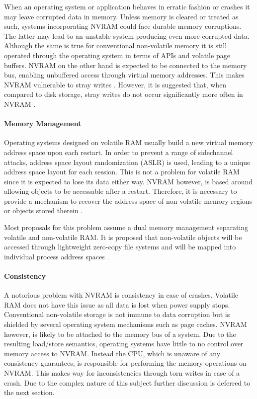When an operating system or application behaves in erratic fashion or crashes it
may leave corrupted data in memory. Unless memory is cleared or treated as such,
systems incorporating NVRAM could face durable memory corruptions. The latter
may lead to an unstable system producing even more corrupted data. Although the
same is true for conventional non-volatile memory it is still operated through
the operating system in terms of APIs and volatile page buffers. NVRAM on the
other hand is expected to be connected to the memory bus, enabling unbuffered
access through virtual memory addresses. This makes NVRAM vulnerable to stray
writes \cite{condit2009better, oukid2017data}. However, it is suggested that,
when compared to disk storage, stray writes do not occur significantly more
often in NVRAM \cite{chen1996rio}.

\paragraph{Memory Management}

Operating systems designed on volatile RAM usually build a new virtual memory
address space upon each restart. In order to prevent a range of sidechannel
attacks, address space layout randomization (ASLR) is used, leading to a unique
address space layout for each session. This is not a problem for volatile RAM
since it is expected to lose its data either way. NVRAM however, is based around
allowing objects to be accessable after a restart. Therefore, it is necessary to
provide a mechanism to recover the address space of non-volatile memory regions
or objects stored therein \cite{oukid2014sofort, schwalb2016hyrise}.

Most proposals for this problem assume a dual memory management separating
volatile and non-volatile RAM. It is proposed that non-volatile objects will be
accessed through lightweight zero-copy file systems and will be mapped into
individual process address spaces \cite{dulloor2014system, schwalb2016hyrise}.

\paragraph{Consistency}

A notorious problem with NVRAM is consistency in case of crashes. Volatile RAM
does not have this issue as all data is lost when power supply stops.
Conventional non-volatile storage is not immune to data corruption but is
shielded by several operating system mechanisms such as page caches. NVRAM
however, is likely to be attached to the memory bus of a system. Due to the
resulting load/store semantics, operating systems have little to no control over
memory access to NVRAM. Instead the CPU, which is unaware of any consistency
guarantees, is responsible for performing the memory operations on NVRAM. This
makes way for inconsistencies through torn writes in case of a crash. Due to the
complex nature of this subject further discussion is deferred to the next
section.

